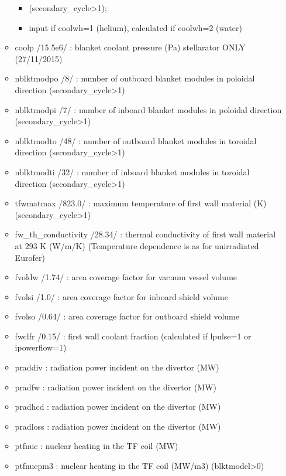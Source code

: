 \documentclass[
]{article}
\providecommand{\tightlist}{%
  \setlength{\itemsep}{0pt}\setlength{\parskip}{0pt}}
\begin{document}
\begin{itemize}
\begin{itemize}
    \begin{itemize}
    \tightlist
    \item
      (secondary\_cycle\textgreater1);
    \item
      input if coolwh=1 (helium), calculated if coolwh=2 (water)
    \end{itemize}
  \item
    coolp /15.5e6/ : blanket coolant pressure (Pa) stellarator ONLY
    (27/11/2015)
  \item
    nblktmodpo /8/ : number of outboard blanket modules in poloidal
    direction (secondary\_cycle\textgreater1)
  \item
    nblktmodpi /7/ : number of inboard blanket modules in poloidal
    direction (secondary\_cycle\textgreater1)
  \item
    nblktmodto /48/ : number of outboard blanket modules in toroidal
    direction (secondary\_cycle\textgreater1)
  \item
    nblktmodti /32/ : number of inboard blanket modules in toroidal
    direction (secondary\_cycle\textgreater1)
  \item
    tfwmatmax /823.0/ : maximum temperature of first wall material (K)
    (secondary\_cycle\textgreater1)
  \item
    fw\_th\_conductivity /28.34/ : thermal conductivity of first wall
    material at 293 K (W/m/K) (Temperature dependence is as for
    unirradiated Eurofer)
  \item
    fvoldw /1.74/ : area coverage factor for vacuum vessel volume
  \item
    fvolsi /1.0/ : area coverage factor for inboard shield volume
  \item
    fvolso /0.64/ : area coverage factor for outboard shield volume
  \item
    fwclfr /0.15/ : first wall coolant fraction (calculated if lpulse=1
    or ipowerflow=1)
  \item
    praddiv : radiation power incident on the divertor (MW)
  \item
    pradfw : radiation power incident on the divertor (MW)
  \item
    pradhcd : radiation power incident on the divertor (MW)
  \item
    pradloss : radiation power incident on the divertor (MW)
  \item
    ptfnuc : nuclear heating in the TF coil (MW)
  \item
    ptfnucpm3 : nuclear heating in the TF coil (MW/m3)
    (blktmodel\textgreater0)

\end{itemize}
\end{itemize}
\end{document}
